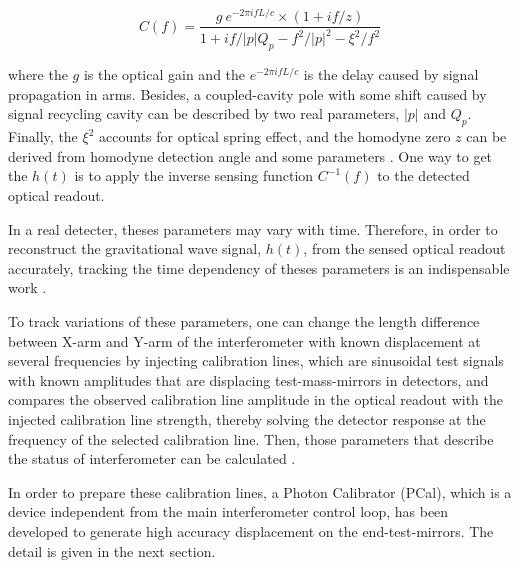 \begin{equation}
\label{eq:mifres}
    C(f)=\frac{
    g~ e^{-2 \pi i f L/c} \times (1+ i f/z)
}{
    1+ i f/|p| Q_p - f^2 /|p|^2 - \xi^2/f^2
}
\end{equation}


where the $g$ is the optical gain and the $e^{-2 \pi i f L/c}$ is the delay caused by signal propagation in arms. Besides, a coupled-cavity pole with some shift caused by signal recycling cavity can be described by two real parameters, $|p|$ and $Q_p$. Finally, the $\xi^2$ accounts for optical spring effect, and the homodyne zero $z$ can be derived from homodyne detection angle and some parameters \cite{mif:response}. One way to get the $h(t)$ is to apply the inverse sensing function $C^{-1}(f)$ to the detected optical readout.

In a real detecter, theses parameters may vary with time. Therefore, in order to reconstruct the gravitational wave signal, $h(t)$, from the sensed optical readout accurately, tracking the time dependency of theses parameters is an indispensable work \cite{ligo:reconstruction,ligo:timedep}. 

To track variations of these parameters, one can change the length difference between X-arm and Y-arm of the interferometer with known displacement at several frequencies by injecting calibration lines, which are sinusoidal test signals with known amplitudes that are displacing test-mass-mirrors in detectors, and compares the observed calibration line amplitude in the optical readout with the injected calibration line strength, thereby solving the detector response at the frequency of the selected calibration line. Then, those parameters that describe the status of interferometer can be calculated \cite{ligo:timedep}.

In order to prepare these calibration lines, a Photon Calibrator (PCal), which is a device independent from the main interferometer control loop, has been developed to generate high accuracy displacement on the end-test-mirrors. The detail is given in the next section.







